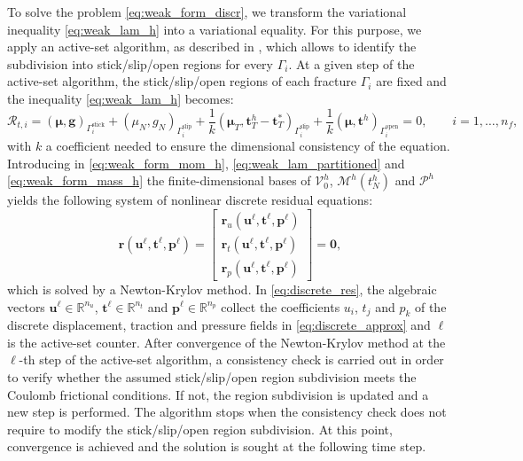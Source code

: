 \documentclass[3p,times]{elsarticle}
\theoremstyle{plain}
\renewcommand{\Vec}[1]{\mathbf{#1}}
\newcommand{\blkVec}[1]{\mathbf{#1}}
\newcommand{\tensorOne}[1]{\boldsymbol#1}
\newcommand{\tensorTwo}[1]{\boldsymbol#1}
\newcommand{\funSpace}[1]{\mathcal{#1}}
\newcommand{\vecFunSpace}[1]{\boldsymbol{\mathcal{#1}}}
\begin{document}
To solve the problem \eqref{eq:weak_form_discr}, we
transform the variational inequality \eqref{eq:weak_lam_h} into a variational equality. For this
purpose, we apply an active-set algorithm, as described in \cite{nocedal2006numerical,
antil2018frontiers, fr2020alg}, which allows to identify
the subdivision into stick/slip/open regions for every $\Gamma_i$. At a given step of the active-set algorithm, the stick/slip/open regions of each fracture $\Gamma_i$ are fixed and the inequality \eqref{eq:weak_lam_h} becomes:
\begin{equation}
  \mathcal{R}_{t,i}
  = \left( \tensorOne{\mu}, \tensorOne{g} \right)_{\Gamma_{i}^{\text{stick}} }
  + \left( \mu_N, g_N\right)_{\Gamma_{i}^{\text{slip}}}
  + \frac{1}{k} \left( \tensorTwo{\mu}_T, \tensorOne{t}_{T}^h - \tensorOne{t}_T^*
    \right)_{\Gamma_{i}^{\text{slip}}}
  + \frac{1}{k} \left( \tensorTwo{\mu}, \tensorTwo{t}^h
    \right)_{\Gamma_{i}^{\text{open}}}
  = 0, \qquad i=1,\ldots,n_f,
  \label{eq:weak_lam_partitioned}
\end{equation}
with $k$ a coefficient needed to ensure the dimensional consistency of the equation. %
Introducing in \eqref{eq:weak_form_mom_h}, \eqref{eq:weak_lam_partitioned} and \eqref{eq:weak_form_mass_h} the finite-dimensional bases of $\vecFunSpace{V}^h_0$,
$\vecFunSpace{M}^h( t_N^h )$ and $\funSpace{P}^h$ yields the
following system of nonlinear discrete residual equations:
\begin{equation}
  \blkVec{r} (\Vec{u}^{\ell}, \Vec{t}^{\ell}, \Vec{p}^{\ell})
  = \begin{bmatrix}
      \blkVec{r}_u (\Vec{u}^{\ell}, \Vec{t}^{\ell}, \Vec{p}^{\ell})\\
      \blkVec{r}_t (\Vec{u}^{\ell}, \Vec{t}^{\ell}, \Vec{p}^{\ell})\\
      \blkVec{r}_p (\Vec{u}^{\ell}, \Vec{t}^{\ell}, \Vec{p}^{\ell})
    \end{bmatrix}
  = \blkVec{0},
  \label{eq:discrete_res}
\end{equation}
which is solved by a Newton-Krylov method. In \eqref{eq:discrete_res}, the algebraic vectors
$\Vec{u}^{\ell}\in\mathbb{R}^{n_u}$, $\Vec{t}^{\ell}\in\mathbb{R}^{n_t}$ and $\Vec{p}^{\ell}\in\mathbb{R}^{n_p}$ collect the coefficients $u_i$,
$t_j$ and $p_k$ of the discrete displacement, traction and pressure fields in \eqref{eq:discrete_approx}
and $\ell$ is the active-set counter. After convergence of the Newton-Krylov method at the $\ell$-th step of the active-set algorithm, a consistency check is carried out in order to verify whether the assumed stick/slip/open region subdivision meets the Coulomb frictional conditions. If not, the region subdivision is updated and a new step is performed. The algorithm stops when the consistency check does not require to modify the stick/slip/open region subdivision. At this point, convergence is achieved and the solution is sought at the following time step. 
\end{document}
